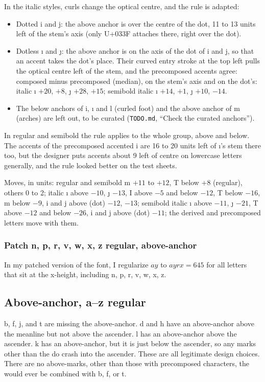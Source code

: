 \documentclass[landscape]{article}
\begin{document}
In the italic styles, curls change the optical centre, and the rule is adapted:
\begin{itemize}
	\item Dotted i and j: the above anchor is over the centre of the dot, 11 to 13 units left of the stem's axis (only U+033F attaches there, right over the dot).
	\item Dotless ı and ȷ: the above anchor is on the axis of the dot of i and j, so that an accent takes the dot's place.
	Their curved entry stroke at the top left pulls the optical centre left of the stem, and the precomposed accents agree:
	composed minus precomposed (median), on the stem's axis and on the dot's: italic ı $+20$, $+8$, ȷ $+28$, $+15$; semibold italic ı $+14$, $+1$, ȷ $+10$, $-14$.
	\item The below anchors of i, ı and l (curled foot) and the above anchor of m (arches) are left out, to be curated (\verb|TODO.md|, ``Check the curated anchors'').
\end{itemize}
In regular and semibold the rule applies to the whole group, above and below.
The accents of the precomposed accented i are 16 to 20 units left of ı's stem there too, but the designer puts accents about 9 left of centre on lowercase letters generally, and the rule looked better on the test sheets.

Moves, in units: regular and semibold m $+11$ to $+12$, T below $+8$ (regular), others 0 to 2;
italic ı above $-10$, ȷ $-13$, I above $-5$ and below $-12$, T below $-16$, m below $-9$, i and j above (dot) $-12$, $-13$;
semibold italic ı above $-11$, ȷ $-21$, T above $-12$ and below $-26$, i and j above (dot) $-11$; the derived and precomposed letters move with them.


\subsubsection*{Patch n, p, r, v, w, x, z regular, above-anchor}

In my patched version of the font, I regularize $ay$ to $ayrx = 645$ 
for all letters that sit at the x-height, including n, p, r, v, w, x, z.


\subsection*{Above-anchor, a--z regular}

b, f, j, and t are missing the above-anchor.
d and h have an above-anchor above the meanline but not above the ascender.
l has an above-anchor above the ascender.
k has an above-anchor, but it is just below the ascender, so any marks other than the do crash into the ascender.
These are all legitimate design choices. 
There are no above-marks, other than those with precomposed characters, the would ever be combined with b, f, or t.
\end{document}
